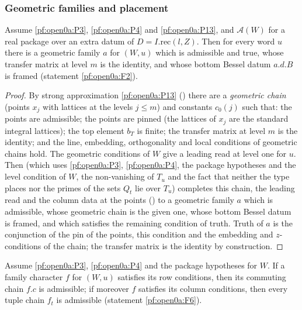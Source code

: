 \subsubsection{Geometric families and placement}

\begin{proposition}\label{pf:open0a:geoall}
Assume \ref{pf:open0a:P3}, \ref{pf:open0a:P4} and \ref{pf:open0a:P13}, and $\mathcal A(W)$ for a real package over an
extra datum of $D=I.\mathrm{rec}(l,Z)$. Then for every word $u$ there is a geometric family $a$ for $(W,u)$ which is
admissible and true, whose transfer matrix at level $m$ is the identity, and whose bottom Bessel datum $a.d.B$ is
framed (statement \ref{pf:open0a:F2}).
\end{proposition}

\begin{proof}
By strong approximation \ref{pf:open0a:P13} () there are a
\emph{geometric chain} (points $x_j$ with lattices at the levels $j\le m$) and constants $c_0(j)$ such that: the points are
admissible; the points are pinned (the lattices of $x_j$ are the standard integral lattices); the top element
$b_T$ is finite; the transfer matrix at level $m$ is the identity; and the line, embedding, orthogonality and local
conditions of geometric chains hold. The geometric conditions of $W$ give a leading read at level one for $u$. Then
 (which uses \ref{pf:open0a:P3}, \ref{pf:open0a:P4}, the package
hypotheses and the level condition of $W$, the non-vanishing of $T_u$ and the fact that neither the type places nor the
primes of the sets $Q_t$ lie over $T_u$) completes this chain, the leading read and the column data at the points
() to a geometric family $a$ which is admissible, whose
geometric chain is the given one, whose bottom Bessel datum is framed, and which satisfies the remaining condition of
truth. Truth of $a$ is the conjunction of the pin of the points, this condition and the embedding and $z$-conditions of
the chain; the transfer matrix is the identity by construction.
\end{proof}

\begin{lemma}\label{pf:open0a:isfam}
Assume \ref{pf:open0a:P3}, \ref{pf:open0a:P4} and the package hypotheses for $W$. If a family character $f$ for
$(W,u)$ satisfies its row conditions, then its commuting chain $f.c$ is admissible; if moreover $f$ satisfies its
column conditions, then every tuple chain $f_t$ is admissible (statement \ref{pf:open0a:F6}).
\end{lemma}


